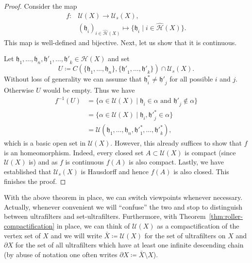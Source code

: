 \begin{proof}
  Consider the map
  \begin{align*}
    f\colon &\mathcal{U}(X) \to \mathcal{U}_s(X),\\
    &(\mathfrak{h}_i)_{i \in \mathcal{\hat H}(X)} \mapsto \{\mathfrak{h}_i \mid i \in \mathcal{\hat H}(X)\}.
  \end{align*}
  This map is well-defined and bijective. Next, let us show that it is continuous.

  Let \(\mathfrak{h}_1, \dots, \mathfrak{h}_n, \mathfrak{h'}_1, \dots,\mathfrak{h'}_k \in \mathcal{H}(X)\) and set
  \[
    U \coloneqq C(\{\mathfrak{h}_1, \dots, \mathfrak{h}_n\}, \{\mathfrak{h'}_1, \dots, \mathfrak{h'}_k\}) \cap \mathcal{U}_s(X).
  \]
  Without loss of generality we can assume that \(\mathfrak{h}^\ast_i \neq \mathfrak{h'}_j\) for all possible \(i\) and \(j\). Otherwise \(U\) would be empty. Thus we have
  \begin{align*}
    f^{-1}(U)
    & = \{\alpha \in \mathcal{U}(X) \mid \mathfrak{h}_i \in \alpha \text{ and } \mathfrak{h'}_j \notin \alpha\}\\
    & = \{\alpha \in \mathcal{U}(X) \mid \mathfrak{h}_i, \mathfrak{h'}^\ast_j \in \alpha\}\\
    & = \mathcal{U}(\mathfrak{h}_1, \dots, \mathfrak{h}_n, \mathfrak{h'}^\ast_1, \dots, \mathfrak{h'}^\ast_k),
  \end{align*}
  which is a basic open set in \(\mathcal{U}(X)\). However, this already suffices to show that \(f\) is an homeomorphism. Indeed, every closed set \(A \subset \mathcal{U}(X)\) is compact (since \(\mathcal{U}(X)\) is) and as \(f\) is continuous \(f(A)\) is also compact. Lastly, we have established that \(\mathcal{U}_s(X)\) is Hausdorff and hence \(f(A)\) is also closed. This finishes the proof.
\end{proof}

With the above theorem in place, we can switch viewpoints whenever necessary. Actually, whenever convenient we will \enquote{confuse} the two and stop to distinguish between ultrafilters and set-ultrafilters. Furthermore, with Theorem~\ref{thm:roller-compactification} in place, we can think of \(\mathcal{U}(X)\) as a compactification of the vertex set of \(X\) and we will write \(\bar X \coloneqq \mathcal{U}(X)\) for the set of ultrafilters on \(X\) and \(\partial X\) for the set of all ultrafilters which have at least one infinite descending chain (by abuse of notation one often writes \(\partial X \coloneqq \bar X \setminus X\)).

